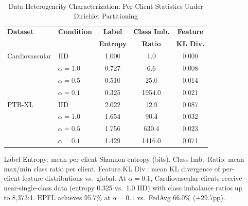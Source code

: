 \documentclass[conference,a4paper]{IEEEtran}
\begin{document}
\begin{table}[htbp]
\centering
\caption{Data Heterogeneity Characterization: Per-Client Statistics Under Dirichlet Partitioning}
\label{tab:heterogeneity_cascade3}
\small
\begin{tabular}{llccc}
\toprule
\textbf{Dataset} & \textbf{Condition} & \textbf{Label} & \textbf{Class Imb.} & \textbf{Feature} \\
 & & \textbf{Entropy} & \textbf{Ratio} & \textbf{KL Div.} \\
\midrule
Cardiovascular & IID & 1.000 & 1.0 & 0.000 \\
 & $\alpha{=}1.0$ & 0.727 & 6.6 & 0.008 \\
 & $\alpha{=}0.5$ & 0.510 & 25.0 & 0.014 \\
 & $\alpha{=}0.1$ & 0.325 & 1954.0 & 0.021 \\
\midrule
PTB-XL & IID & 2.022 & 12.9 & 0.087 \\
 & $\alpha{=}1.0$ & 1.654 & 90.4 & 0.032 \\
 & $\alpha{=}0.5$ & 1.756 & 630.4 & 0.023 \\
 & $\alpha{=}0.1$ & 1.429 & 1416.0 & 0.071 \\
\bottomrule
\end{tabular}

\vspace{1mm}
\footnotesize{Label Entropy: mean per-client Shannon entropy (bits). Class Imb.\ Ratio: mean max/min class ratio per client. Feature KL Div.: mean KL divergence of per-client feature distributions vs.\ global. At $\alpha{=}0.1$, Cardiovascular clients receive near-single-class data (entropy 0.325 vs.\ 1.0 IID) with class imbalance ratios up to 8,373:1. HPFL achieves 95.7\% at $\alpha{=}0.1$ vs.\ FedAvg 66.0\% (+29.7pp).}
\end{table}
\end{document}
